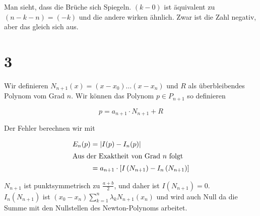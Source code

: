 \documentclass[ngerman,a4paper]{scrartcl}
\begin{document}
Man sieht, dass die Brüche sich Spiegeln. $(k-0)$ ist äquivalent zu
$(n-k-n)=(-k)$ und die andere wirken ähnlich. Zwar ist die Zahl
negativ, aber das gleich sich aus.

\section*{3}

Wir definieren $N_{n+1}(x) = (x - x_0)\dots(x-x_n)$ und $R$ als
überbleibendes Polynom vom Grad $n$. Wir können das Polynom $p \in
P_{n+1}$ so definieren

\[
p = a_{n+1} \cdot N_{n+1} + R
\]

Der Fehler berechnen wir mit

\begin{align*}
  E_n(p) &= |I(p) - I_n(p)|\\
  \intertext{Aus der Exaktheit von Grad $n$ folgt}
  &= a_{n+1}\cdot\left[I\left(N_{n+1}\right) -
    I_n\left(N_{n+1}\right)\right]
\end{align*}

$N_{n+1}$ ist punktsymmetrisch zu $\frac{a+b}{2}$, und daher ist
$I(N_{n+1}) = 0$.\\

$I_n(N_{n+1})$ ist $(x_0 - x_n)\sum^n_{k=1} \lambda_k N_{n+1}(x_n)$
und wird auch Null da die Summe mit den Nullstellen des
Newton-Polynoms arbeitet.
\end{document}
